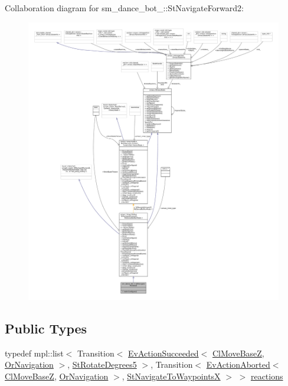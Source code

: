 Collaboration diagram for sm\+\_\+dance\+\_\+bot\+\_\+:\+:St\+Navigate\+Forward2\+:
\nopagebreak
\begin{figure}[H]
\begin{center}
\leavevmode
\includegraphics[width=350pt]{structsm__dance__bot__2_1_1StNavigateForward2__coll__graph}
\end{center}
\end{figure}
\subsection*{Public Types}
\begin{DoxyCompactItemize}
\item 
typedef mpl\+::list$<$ Transition$<$ \hyperlink{structsmacc_1_1default__events_1_1EvActionSucceeded}{Ev\+Action\+Succeeded}$<$ \hyperlink{classcl__move__base__z_1_1ClMoveBaseZ}{Cl\+Move\+BaseZ}, \hyperlink{classsm__dance__bot__2_1_1OrNavigation}{Or\+Navigation} $>$, \hyperlink{structsm__dance__bot__2_1_1StRotateDegrees5}{St\+Rotate\+Degrees5} $>$, Transition$<$ \hyperlink{structsmacc_1_1default__events_1_1EvActionAborted}{Ev\+Action\+Aborted}$<$ \hyperlink{classcl__move__base__z_1_1ClMoveBaseZ}{Cl\+Move\+BaseZ}, \hyperlink{classsm__dance__bot__2_1_1OrNavigation}{Or\+Navigation} $>$, \hyperlink{structsm__dance__bot__2_1_1StNavigateToWaypointsX}{St\+Navigate\+To\+WaypointsX} $>$ $>$ \hyperlink{structsm__dance__bot__2_1_1StNavigateForward2_a1a3c17ed899e30094d36d8507af995db}{reactions}
\end{DoxyCompactItemize}
